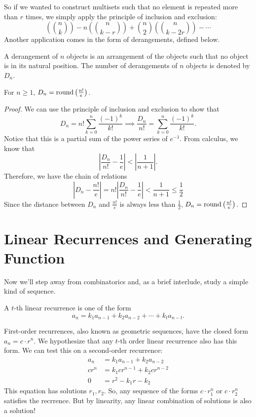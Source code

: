 \documentclass[../m055main.tex]{subfiles}
\begin{document}
\pagebreak

So if we wanted to construct multisets such that no element is repeated more than $r$ times, we simply apply the principle of inclusion and exclusion:
\[ \left( {n \choose k} \right) - n \left( {n \choose k - r} \right) + {n \choose 2} \left( {n \choose k - 2r} \right) - \cdots \]
Another application comes in the form of derangements, defined below.

\begin{definition}[Derangement]
    A derangement of $n$ objects is an arrangement of the objects such that no object is in its natural position.
    The number of derangements of $n$ objects is denoted by $D_n$.
\end{definition}

\begin{theorem}[]
    For $n \geq 1$, $D_n = \textrm{round} \left( \frac{n!}{e} \right)$.
\end{theorem}

\begin{proof}
    We can use the principle of inclusion and exclusion to show that
    \[ D_n = n! \sum_{k=0}^{n} \frac{(-1)^k}{k!} \implies \frac{D_n}{n!} = \sum_{k=0}^{n} \frac{(-1)^k}{k!}. \]
    Notice that this is a partial sum of the power series of $e^{-1}$.
    From calculus, we know that
    \[ \left| \frac{D_n}{n!} - \frac{1}{e} \right| < \left| \frac{1}{n+1} \right|. \]
    Therefore, we have the chain of relations
    \[ \left| D_n - \frac{n!}{e} \right| = n! \left| \frac{D_n}{n!} - \frac{1}{e} \right| < \frac{1}{n+1} \leq \frac{1}{2} \]
    Since the distance between $D_n$ and $\frac{n!}{e}$ is always less than $\frac{1}{2}$, $D_n =\textrm{round}\left( \frac{n!}{e} \right)$.
\end{proof}

\section{Linear Recurrences and Generating Function}
Now we'll step away from combinatorics and, as a brief interlude, study a simple kind of sequence.

\begin{definition}
    A $t$-th linear recurrence is one of the form
    \[ a_n = k_1 a_{n-1} + k_2a_{n-2} + \cdots + k_t a_{n-t}. \]
\end{definition}

First-order recurrences, also known as geometric sequences, have the closed form $a_n = c \cdot r^n$.
We hypothesize that any $t$-th order linear recurrence also has this form.
We can test this on a second-order recurrence:
\begin{align*}
    a_n &= k_1 a_{n-1} + k_2 a_{n-2} \\
    c r^{n} &= k_1 cr^{n-1} + k_2 cr^{n-2} \\
    0 &= r^2 - k_1 r - k_2
\end{align*}
This equation has solutions $r_1, r_2$.
So, any sequence of the forms $c \cdot r_1^{n}$ or $c \cdot r_2^{n}$ satisfies the recrrence.
But by linearity, any linear combination of solutions is also a solution!
\end{document}
